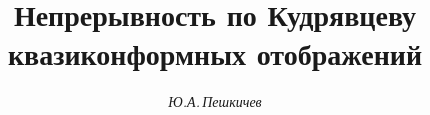 

 


%


\newcommand{\osc}{\operatorname{osc}} 


\newcommand{\const}{\operatorname{const}} 


\newcommand{\tts}[1]{} 


 




 


\setcounter{page}{48} 












 


\author{\it Ю.А.\,Пешкичев} 




\title{Непрерывность по Кудрявцеву\\ квазиконформных отображений} 


 


\date{} 




\pagestyle{plain} %


 




\maketitle 


